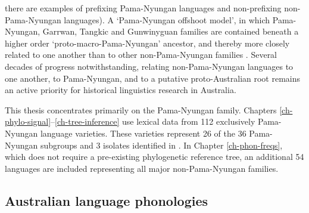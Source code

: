 there are examples of prefixing Pama-Nyungan languages and non-prefixing non-Pama-Nyungan languages). A `Pama-Nyungan offshoot model', in which Pama-Nyungan, Garrwan, Tangkic and Gunwinyguan families are contained beneath a higher order `proto-macro-Pama-Nyungan' ancestor, and thereby more closely related to one another than to other non-Pama-Nyungan families \autocites{ogrady_preliminaries_1979}{evans_cradle_1997}{evans_enigma_1998}. Several decades of progress notwithstanding, relating non-Pama-Nyungan languages to one another, to Pama-Nyungan, and to a putative proto-Australian root remains an active priority for historical linguistics research in Australia.

This thesis concentrates primarily on the Pama-Nyungan family. Chapters \ref{ch-phylo-signal}--\ref{ch-tree-inference} use lexical data from 112 exclusively Pama-Nyungan language varieties. These varieties represent 26 of the 36 Pama-Nyungan subgroups and 3 isolates identified in \textcite{bowern_pama-nyungan_2018}. In Chapter \ref{ch-phon-freqs}, which does not require a pre-existing phylogenetic reference tree, an additional 54 languages are included representing all major non-Pama-Nyungan families.

\hypertarget{australian-language-phonologies}{%
\subsection{Australian language phonologies}\label{australian-language-phonologies}}

